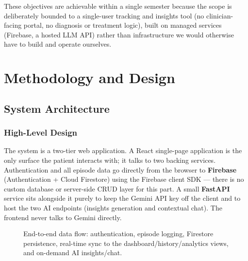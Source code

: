 \documentclass[11pt,a4paper]{article}
\begin{document}
These objectives are achievable within a single semester because the scope is deliberately
bounded to a single-user tracking and insights tool (no clinician-facing portal, no diagnosis
or treatment logic), built on managed services (Firebase, a hosted LLM API) rather than
infrastructure we would otherwise have to build and operate ourselves.

\vspace{2pt}
\noindent{}

\section{Methodology and Design}

\subsection{System Architecture}

\subsubsection{High-Level Design}
The system is a two-tier web application. A React single-page application is the only surface
the patient interacts with; it talks to two backing services. Authentication and all episode
data go directly from the browser to \textbf{Firebase} (Authentication + Cloud Firestore) using
the Firebase client SDK — there is no custom database or server-side CRUD layer for this part.
A small \textbf{FastAPI} service sits alongside it purely to keep the Gemini API key off the
client and to host the two AI endpoints (insights generation and contextual chat). The frontend
never talks to Gemini directly.

\begin{figure}[h!]
\centering
{}
\caption{End-to-end data flow: authentication, episode logging, Firestore persistence,
real-time sync to the dashboard/history/analytics views, and on-demand AI insights/chat.}
\end{figure}
\end{document}

